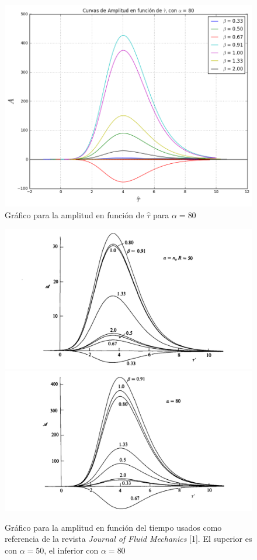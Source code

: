\documentclass[12pt, notitlepage]{article}
\begin{document}
\begin{figure}[H]
\centering
\includegraphics[scale = 0.55]{alfa80.png}
\caption{Gráfico para la amplitud en función de $\hat{\tau}$ para $\alpha = 80$}
\end{figure}

\begin{figure}
\centering
\includegraphics[scale=0.25]{asd1.jpg}
\includegraphics[scale=0.25]{asd2.jpg}
\caption{Gráfico para la amplitud en función del tiempo usados como referencia de la revista \textit{Journal of Fluid Mechanics} [1]. El superior es con $\alpha = 50$, el inferior con $\alpha = 80$}
\end{figure}
\end{document}
